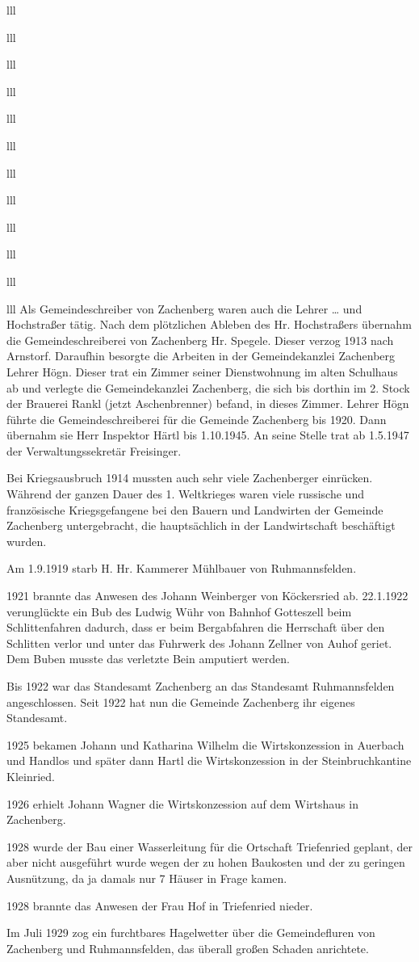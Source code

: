 \documentclass[12pt,a4pager]{book}
\begin{document}
\begin{tabuluar}{lll}
\begin{tabuluar}{lll}
\begin{tabuluar}{lll}
\begin{tabuluar}{lll}
\begin{tabuluar}{lll}
\begin{tabuluar}{lll}
\begin{tabuluar}{lll}
\begin{tabuluar}{lll}
\begin{tabuluar}{lll}
\begin{tabuluar}{lll}
\begin{tabuluar}{lll}
\begin{tabuluar}{lll}
Als Gemeindeschreiber von Zachenberg waren auch die Lehrer … und Hochstraßer
tätig. Nach dem plötzlichen Ableben des Hr. Hochstraßers übernahm die
Gemeindeschreiberei von Zachenberg Hr. Spegele. Dieser verzog 1913 nach
Arnstorf. Daraufhin besorgte die Arbeiten in der Gemeindekanzlei Zachenberg
Lehrer Högn. Dieser trat ein Zimmer seiner Dienstwohnung im alten Schulhaus ab
und verlegte die Gemeindekanzlei Zachenberg, die sich bis dorthin im 2. Stock
der Brauerei Rankl (jetzt Aschenbrenner) befand, in dieses Zimmer. Lehrer Högn
führte die Gemeindeschreiberei für die Gemeinde Zachenberg bis 1920. Dann
übernahm sie Herr Inspektor Härtl bis 1.10.1945. An seine Stelle trat ab
1.5.1947 der Verwaltungssekretär Freisinger.

Bei Kriegsausbruch 1914 mussten auch sehr viele Zachenberger einrücken. Während
der ganzen Dauer des 1. Weltkrieges waren viele russische und französische
Kriegsgefangene bei den Bauern und Landwirten der Gemeinde Zachenberg
untergebracht, die hauptsächlich in der Landwirtschaft beschäftigt wurden.

Am 1.9.1919 starb H. Hr. Kammerer Mühlbauer von Ruhmannsfelden.

1921 brannte das Anwesen des Johann Weinberger von Köckersried ab. 22.1.1922
verunglückte ein Bub des Ludwig Wühr von Bahnhof Gotteszell beim Schlittenfahren
dadurch, dass er beim Bergabfahren die Herrschaft über den Schlitten verlor und
unter das Fuhrwerk des Johann Zellner von Auhof geriet. Dem Buben musste das
verletzte Bein amputiert werden.

Bis 1922 war das Standesamt Zachenberg an das Standesamt Ruhmannsfelden
angeschlossen. Seit 1922 hat nun die Gemeinde Zachenberg ihr eigenes Standesamt.

1925 bekamen Johann und Katharina Wilhelm die Wirtskonzession in Auerbach und
Handlos und später dann Hartl die Wirtskonzession in der Steinbruchkantine
Kleinried.

1926 erhielt Johann Wagner die Wirtskonzession auf dem Wirtshaus in Zachenberg.

1928 wurde der Bau einer Wasserleitung für die Ortschaft Triefenried geplant,
der aber nicht ausgeführt wurde wegen der zu hohen Baukosten und der zu geringen
Ausnützung, da ja damals nur 7 Häuser in Frage kamen.

1928 brannte das Anwesen der Frau Hof in Triefenried nieder.

Im Juli 1929 zog ein furchtbares Hagelwetter über die Gemeindefluren von
Zachenberg und Ruhmannsfelden, das überall großen Schaden anrichtete.


\end{tabuluar}
\end{tabuluar}
\end{tabuluar}
\end{tabuluar}
\end{tabuluar}
\end{tabuluar}
\end{tabuluar}
\end{tabuluar}
\end{tabuluar}
\end{tabuluar}
\end{tabuluar}
\end{tabuluar}
\end{document}
